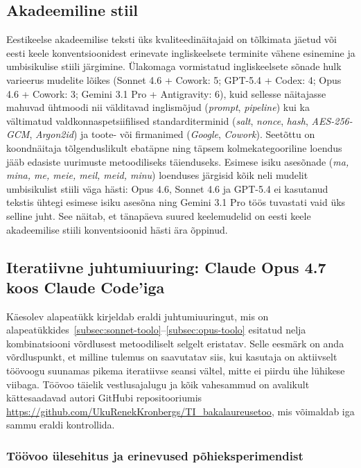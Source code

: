 \subsection{Akadeemiline stiil} \label{subsec:akadeem-stiil}

Eestikeelse akadeemilise teksti üks kvaliteedinäitajaid on tõlkimata jäetud või eesti keele konventsioonidest erinevate ingliskeelsete terminite vähene esinemine ja umbisikulise stiili järgimine. Ülakomaga vormistatud ingliskeelsete sõnade hulk varieerus mudelite lõikes (Sonnet 4.6 + Cowork: 5; GPT-5.4 + Codex: 4; Opus 4.6 + Cowork: 3; Gemini 3.1 Pro + Antigravity: 6), kuid sellesse näitajasse mahuvad ühtmoodi nii välditavad inglismõjud (\textit{prompt}, \textit{pipeline}) kui ka vältimatud valdkonnaspetsiifilised standarditerminid (\textit{salt}, \textit{nonce}, \textit{hash}, \textit{AES-256-GCM}, \textit{Argon2id}) ja toote- või firmanimed (\textit{Google}, \textit{Cowork}). Seetõttu on koondnäitaja tõlgenduslikult ebatäpne ning täpsem kolmekategooriline loendus jääb edasiste uurimuste metoodiliseks täienduseks. Esimese isiku asesõnade (\textit{ma, mina, me, meie, meil, meid, minu}) loenduses järgisid kõik neli mudelit umbisikulist stiili väga hästi: Opus 4.6, Sonnet 4.6 ja GPT-5.4 ei kasutanud tekstis ühtegi esimese isiku asesõna ning Gemini 3.1 Pro töös tuvastati vaid üks selline juht. See näitab, et tänapäeva suured keelemudelid on eesti keele akadeemilise stiili konventsioonid hästi ära õppinud.

\subsection{Iteratiivne juhtumiuuring: Claude Opus 4.7 koos Claude Code'iga} \label{subsec:opus47-juhtum}
\enlargethispage{5pt}

Käesolev alapeatükk kirjeldab eraldi juhtumiuuringut, mis on alapeatükkides~\ref{subsec:sonnet-toolo}--\ref{subsec:opus-toolo} esitatud nelja kombinatsiooni võrdlusest metoodiliselt selgelt eristatav. Selle eesmärk on anda võrdluspunkt, et milline tulemus on saavutatav siis, kui kasutaja on aktiivselt töövoogu suunamas pikema iteratiivse seansi vältel, mitte ei piirdu ühe lühikese viibaga. Töövoo täielik vestlusajalugu ja kõik vahesammud on avalikult kättesaadavad autori GitHubi repositooriumis {\url{https://github.com/UkuRenekKronbergs/TI_bakalaureusetoo}}, mis võimaldab iga sammu eraldi kontrollida.

\subsubsection{Töövoo ülesehitus ja erinevused põhieksperimendist}

